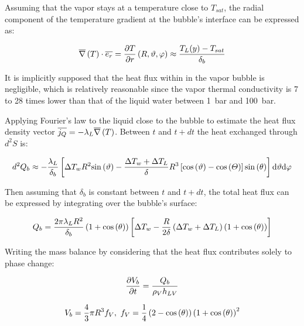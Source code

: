 Assuming that the vapor stays at a temperature close to $T_{sat}$, the radial component of the temperature gradient at the bubble's interface can be expressed as:

\begin{align}
\overline{\nabla}\left({T}\right) \cdot \overline{e_{r}} = \frac{\partial T}{\partial r}\left( R, \vartheta, \varphi \right) \approx\frac{T_{L}(y)-T_{sat}}{\delta_{b}}
\end{align}


\begin{note*}{}
It is implicitly supposed that the heat flux within in the vapor bubble is negligible, which is relatively reasonable since the vapor thermal conductivity is 7 to 28 times lower than that of the liquid water between 1\ bar and 100\ bar.
\end{note*}

\npar



Applying Fourier's law to the liquid close to the bubble to estimate the heat flux density vector $\overline{j_{Q}}=-\lambda_{L} \overline{\nabla}\left({T}\right)$. Between $t$ and $t+dt$ the heat exchanged through $d^{2}S$ is:

\begin{align}
d^{2}Q_{b} \approx -\frac{\lambda_{L}}{\delta_{b}}\left[  \Delta T_{w}R^{2}\mathrm{sin}\left( \vartheta \right)-\frac{\Delta T_{w}+\Delta T_{L}}{\delta}R^{3}\left[  \mathrm{cos}\left( \vartheta \right)-\mathrm{cos}\left( \varTheta \right)  \right] \mathrm{sin}\left( \theta \right)  \right] \mathrm{d}\vartheta \mathrm{d}\varphi
\end{align}

\npar
Then assuming that $\delta_{b}$ is constant between $t$ and $t+dt$, the total heat flux can be expressed by integrating over the bubble's surface:

\begin{align}
Q_{b}=\frac{2\pi \lambda_{L} R^{2}}{\delta_{b}} \left( 1+\mathrm{cos}\left( \theta \right)  \right) \left[ \Delta T_{w} - \frac{R}{2\delta}\left(  \Delta T_{w} + \Delta T_{L}  \right)  \left( 1 + \mathrm{cos}\left( \theta \right) \right)  \right]
\end{align}

Writing the mass balance by considering that the heat flux contributes solely to phase change:

\begin{align}
\frac{\partial{V_{b}}}{\partial t}=\frac{Q_{b}}{\rho_{V}h_{LV}}
\end{align}

\begin{equation}
V_{b} = \frac{4}{3}\pi R^{3} f_{V},\ f_{V} = \frac{1}{4}\parth{2-\cos{\theta}}\parth{1+\cos{\theta}}^{2}
\end{equation}

